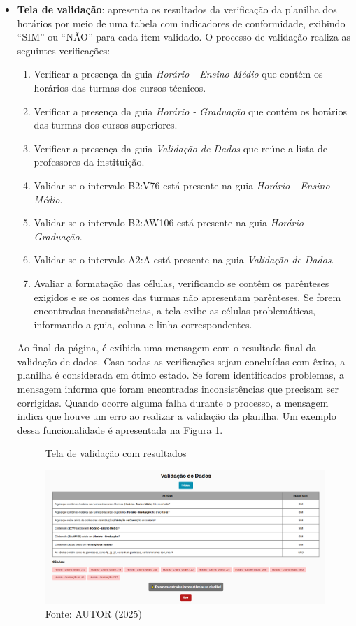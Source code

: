 \begin{itemize}
    \item \textbf{Tela de validação}: apresenta os resultados da verificação da planilha dos horários por meio de uma tabela com indicadores de conformidade, exibindo ``SIM'' ou ``NÃO'' para cada item validado. O processo de validação realiza as seguintes verificações:
    \begin{enumerate}
        \item Verificar a presença da guia \textit{Horário - Ensino Médio} que contém os horários das turmas dos cursos técnicos.
        \item Verificar a presença da guia \textit{Horário - Graduação} que contém os horários das turmas dos cursos superiores.
        \item Verificar a presença da guia \textit{Validação de Dados} que reúne a lista de professores da instituição.
        \item Validar se o intervalo B2:V76 está presente na guia \textit{Horário - Ensino Médio}.
        \item Validar se o intervalo B2:AW106 está presente na guia \textit{Horário - Graduação}.
        \item Validar se o intervalo A2:A está presente na guia \textit{Validação de Dados}.
        \item Avaliar a formatação das células, verificando se contêm os parênteses exigidos e se os nomes das turmas não apresentam parênteses. Se forem encontradas inconsistências, a tela exibe as células problemáticas, informando a guia, coluna e linha correspondentes.
    \end{enumerate}

    Ao final da página, é exibida uma mensagem com o resultado final da validação de dados. Caso todas as verificações sejam concluídas com êxito, a planilha é considerada em ótimo estado. Se forem identificados problemas, a mensagem informa que foram encontradas inconsistências que precisam ser corrigidas. Quando ocorre alguma falha durante o processo, a mensagem indica que houve um erro ao realizar a validação da planilha. Um exemplo dessa funcionalidade é apresentada na Figura \ref{fig_front_22}.

    \begin{figure}[htb]
        \centering
        \caption{Tela de validação com resultados}
        \includegraphics[width=1\textwidth]{Figuras/front-22.png}
        \caption*{Fonte: AUTOR (2025)}
        \label{fig_front_22}
    \end{figure}
\end{itemize}

